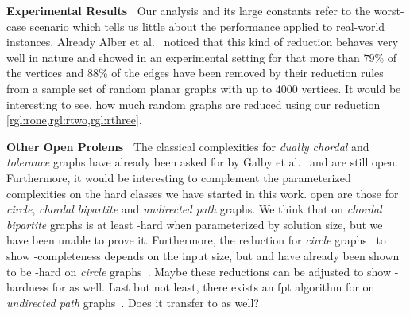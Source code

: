 \noindent \textbf{Experimental Results~}
Our analysis and its large constants refer to the worst-case scenario which tells us little about the performance applied to real-world instances.
Already Alber et al.~\cite{Alber2004} noticed that this kind of reduction behaves very well in nature and showed in an experimental setting for \pdom that more than $79\%$ of the vertices and $88\%$ of the edges have been removed by their reduction rules from a sample set of random planar graphs with up to $4000$ vertices. 
It would be interesting to see, how much random graphs are reduced using our reduction \cref{rgl:rone,rgl:rtwo,rgl:rthree}.

\noindent \textbf{Other Open Prolems~}
The classical complexities for \textit{dually chordal} and \textit{tolerance} graphs have already been asked for by Galby et al.~\cite{Galby2020} and are still open.
Furthermore, it would be interesting to complement the parameterized complexities on the hard classes we have started in this work.
open are those for \textit{circle}, \textit{chordal bipartite} and \textit{undirected path} graphs.
We think that \sdoms on \textit{chordal bipartite} graphs is at least \WONEhs-hard when parameterized by solution size, but we have been unable to prove it.
Furthermore, the reduction for \textit{circle} graphs~\cite{Kloks2021} to show \NP-completeness depends on the input size, but \doms and \tdoms have already been shown to be \WONEhs-hard on \textit{circle} graphs~\cite{Bousquet2012}. 
Maybe these reductions can be adjusted to show \WONEhs-hardness for \sdoms as well.
Last but not least, there exists an fpt algorithm for \doms on \textit{undirected path} graphs~\cite{Figueiredo2022}. 
Does it transfer to \sdoms as well?
